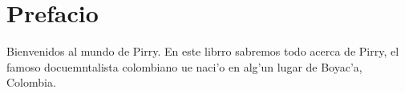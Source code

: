 \chapter{Prefacio}
Bienvenidos al mundo de Pirry. En este librro sabremos todo acerca de Pirry, el famoso docuemntalista colombiano ue naci'o en alg'un lugar de Boyac'a, Colombia.
